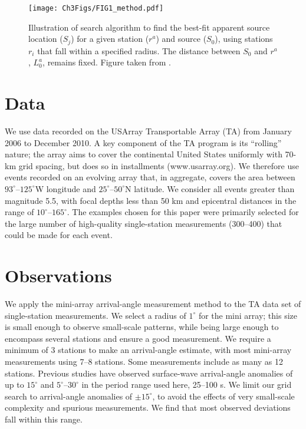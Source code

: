 \documentclass[12pt,oneside]{book}
\newcommand{\degree}[1]{\mbox{$#1^{\circ}$}}
\begin{document}
\begin{figure} 
\begin{center}
\texttt{[image: Ch3Figs/FIG1\_method.pdf]} 
\caption[Mini-array method illustration]{Illustration of search algorithm to find the best-fit apparent source location ($S_j$) for a given station ($r^{a}$) and source ($S_{0}$), using stations $r_i$ that fall within a specified radius. The distance between $S_{0}$ and $r^{a}$, 
$L^a_{0}$, remains fixed. Figure taken from \citet{Fosteretal2014}. }
\label{figaa:BFillusaa}
\end{center}
\end{figure}
%

\section{Data}\label{sec:data}
We use data recorded on the USArray Transportable Array (TA) from January 2006 to December 2010. A key component of the TA program is its ``rolling'' nature; the array aims to cover the continental United States uniformly with 70\nobreakdash-km grid spacing, but does so in installments (www.usarray.org). We therefore use events recorded on an evolving array that, in aggregate, covers the area between \degree{93}--\degree{125}W longitude and \degree{25}--\degree{50}N latitude. We consider all events greater than magnitude 5.5, with focal depths less than 50 km and epicentral distances in the range of \degree{10}--\degree{165}. The examples chosen for this paper were primarily selected for the large number of high-quality single-station measurements (300--400) that could be made for each event. 

\section{Observations}
We apply the mini-array arrival-angle measurement method to the TA data set of single-station measurements. We select a radius of \degree{1} for the mini array; this size is small enough to observe small-scale patterns, while being large enough to encompass several stations and ensure a good measurement. We require a minimum of 3 stations to make an arrival-angle estimate, with most mini-array measurements using 7--8 stations. Some measurements include as many as 12 stations. Previous studies have observed surface-wave arrival-angle anomalies of up to \degree{15} \citep{Lerner-Lam1989} and \degree{5}--\degree{30} \citep{Laske1994} in the period range used here, 25--100 s. We limit our grid search to arrival-angle anomalies of $\pm\degree{15}$, to avoid the effects of very small-scale complexity and spurious measurements. We find that most observed deviations fall within this range. 
\end{document}
